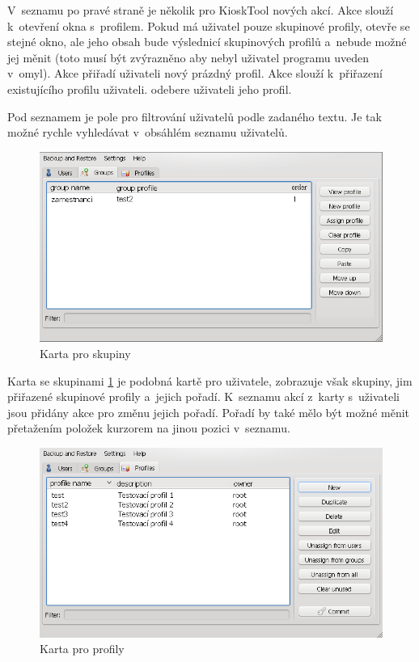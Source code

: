 V~seznamu po pravé straně je několik pro KioskTool nových akcí. Akce  slouží k~otevření okna s~profilem. Pokud má uživatel pouze skupinové profily, otevře se stejné okno, ale jeho obsah bude výslednicí skupinových profilů a~nebude možné jej měnit (toto musí být zvýrazněno aby nebyl uživatel programu uveden v~omyl). Akce  přiřadí uživateli nový prázdný profil. Akce  slouží k~přiřazení existujícího profilu uživateli.  odebere uživateli jeho profil.

Pod seznamem je pole pro filtrování uživatelů podle zadaného textu. Je tak možné rychle vyhledávat v~obsáhlém seznamu uživatelů.

\begin{figure}
\centering
\includegraphics[width=13cm]{obrazky/navrh-groupsz.png}
\caption{Karta pro skupiny}
\label{fig:kt4_newgroups}
\end{figure}

Karta se skupinami \ref{fig:kt4_newgroups} je podobná kartě pro uživatele, zobrazuje však skupiny, jim přiřazené skupinové profily a~jejich pořadí. K~seznamu akcí z~karty s~uživateli jsou přidány akce pro změnu jejich pořadí. Pořadí by také mělo být možné měnit přetažením položek kurzorem na jinou pozici v~seznamu.

\begin{figure}[h]
    \centering
    \includegraphics[width=13cm]{obrazky/navrh-profiles-fixd.png}
    \caption{Karta pro profily}
    \label{fig:kt4_newprofiles}
\end{figure}

